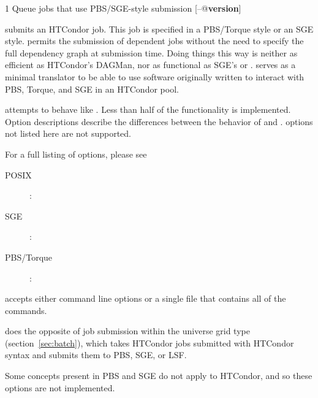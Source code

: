 \begin{ManPage}{\label{man-condor-qsub}}{1}
{Queue jobs that use PBS/SGE-style submission}
\Synopsis {}
[\verb@--@\textbf{version}]


\Description

 submits an HTCondor job.
This job is specified in a PBS/Torque style or an SGE style.
 permits the 
submission of dependent jobs without the need to specify the full
dependency graph at submission time.
Doing things this way is neither as efficient
as HTCondor's DAGMan, nor as functional as SGE's  or .
 serves as a minimal translator to be able to use 
software originally written to interact 
with PBS, Torque, and SGE in an HTCondor pool. 

 attempts to behave like . 
Less than half of the 
functionality is implemented. 
Option descriptions 
describe the differences between the behavior of  and 
.
 options not listed here are not supported.

For a full listing of  options, please see
\begin{description}
\item[POSIX]: 
\item[SGE]: 
\item[PBS/Torque]: 
\end{description}

 accepts
either command line options or a single file that contains all of the 
commands. 

 does the opposite of job submission within the 
 universe 
 grid type (section~\ref{sec:batch}),
which takes HTCondor jobs submitted with HTCondor
syntax and submits them to PBS, SGE, or LSF.

Some concepts present in PBS and SGE do not apply to HTCondor,
and so these options are not implemented.


\end{ManPage}
